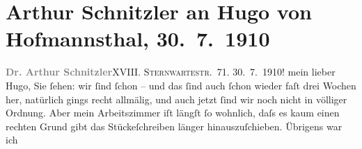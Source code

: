 

         
         \renewcommand{\erwaehntePersonen}{Personen: Otto Brahm, Rose Friedmann, Louis Philipp Friedmann, Hugo von Hofmannsthal, Gertrude von Hofmannsthal, Clara Jonas, Josef Kainz, Olga Schnitzler, Heinrich Schnitzler}
         \renewcommand{\erwaehnteOrte}{Orte: Aspang-Markt, Bad Ischl, Edmund-Weiß-Gasse, Glion, Kirchberg am Wechsel, Mönichkirchen, Otterthal, Rodaun, Semmering, Sonnwendstein, St. Gilgen, Sternwartestraße, Welsberg-Taisten, Wien, Österreich}
         \renewcommand{\erwaehnteWerke}{Werke: Der junge Medardus. Dramatische Historie in einem Vorspiel und fünf Aufzügen}
               \section[Arthur Schnitzler an Hugo von Hofmannsthal, 30. 7. 1910]{ Arthur Schnitzler an Hugo von Hofmannsthal, 30. 7. 1910}\nopagebreak{}\rehead{ }\begin{ledgroupsized}[t]{13cm}\normalsize\beginnumbering \toendnotes[C]{\smallbreak\pagebreak[2]} 
\toendnotes[C]{\smallbreak}\pstart
           \noindent{}{\pb}\textcolor{gray}{\textbf{Dr. Arthur Schnitzler}}\hfill XVIII. \textsc{Sternwartestr}. 71.\pend
           \pstart
           \textcolor{gray}{\textbf{}}\hfill 30. 7. 1910!\pend
           \pstart
           mein lieber Hugo, Sie ſehen: wir ſind ſchon \label{K_L01952-1v}\label{K_L01952-1h} – und das ſind auch ſchon wieder faſt drei Wochen her, natürlich gings recht
               allmälig, und auch jetzt ſind wir noch nicht in völliger Ordnung. Aber mein
               Arbeitszimmer iſt längſt ſo wohnlich, daſs es kaum einen rechten Grund gibt das
               Stückeſchreiben länger hinauszuſchieben. Übrigens war ich \label{K_L01952-2v}
\end{ledgroupsized}
